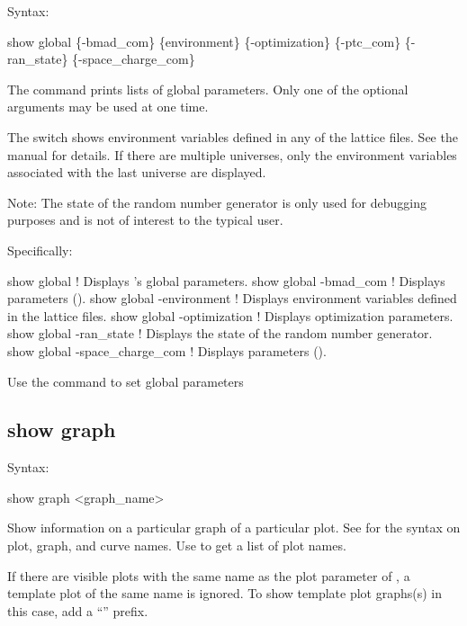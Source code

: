 {{{{{{{{{Syntax:
\begin{example}
  show global \{-bmad_com\} \{environment\} \{-optimization\} \{-ptc_com\} 
                                              \{-ran_state\} \{-space_charge_com\} 
\end{example}

The  command prints lists of global parameters. Only one of the optional
arguments may be used at one time.

The  switch shows environment variables defined in any of the \bmad lattice
files. See the \bmad manual for details. If there are multiple universes, only the environment
variables associated with the last universe are displayed.

Note: The state of the random number generator is only used for debugging purposes and is not of
interest to the typical user.

Specifically:
\begin{example}
  show global                   ! Displays \tao's global parameters.
  show global -bmad_com         ! Displays  parameters ().
  show global -environment      ! Displays environment variables defined in the lattice files.
  show global -optimization     ! Displays optimization parameters.
  show global -ran_state        ! Displays the state of the random number generator.
  show global -space_charge_com ! Displays  parameters ().
\end{example}

Use the  command to set global parameters 


\subsection{show graph}
\label{s:show.graph}

Syntax:
\begin{example}
  show graph <graph_name>
\end{example}

Show information on a particular graph of a particular plot. See  for the syntax on
plot, graph, and curve names.  Use  to get a list of plot names.

If there are visible plots with the same name as the plot parameter of , a template plot
of the same name is ignored. To show template plot graphs(s) in this case, add a ``''
prefix.

}}}}}}}}}
